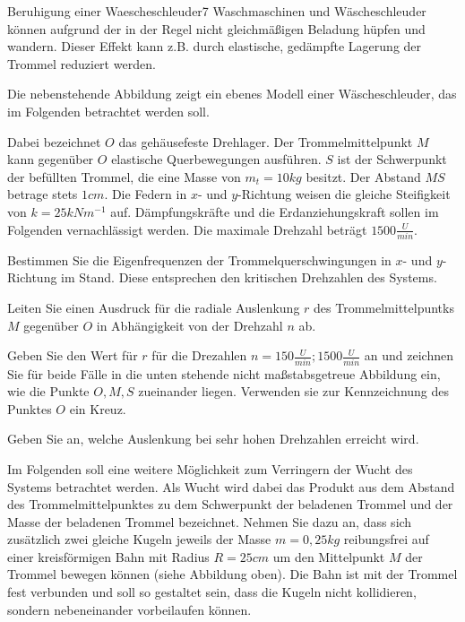 \begin{problem}{Beruhigung einer Waescheschleuder}{7}
Waschmaschinen und Wäscheschleuder können aufgrund der in der Regel nicht gleichmäßigen Beladung hüpfen und wandern. Dieser Effekt kann z.B. durch elastische, gedämpfte Lagerung der Trommel reduziert werden.

Die nebenstehende Abbildung zeigt ein ebenes Modell einer Wäscheschleuder, das im Folgenden betrachtet werden soll.


Dabei bezeichnet $O$ das gehäusefeste Drehlager.  Der Trommelmittelpunkt $M$ kann gegenüber $O$ elastische Querbewegungen ausführen.  $S$ ist der Schwerpunkt der befüllten Trommel, die eine Masse von $m_t=10\unit{kg}$ besitzt.  Der Abstand $MS$ betrage stets $1\unit{cm}$.  Die Federn in $x$- und $y$-Richtung weisen die gleiche Steifigkeit von $k=25\unit{kNm^{-1}}$ auf.  Dämpfungskräfte und die Erdanziehungskraft sollen im Folgenden vernachlässigt werden.  Die maximale Drehzahl beträgt $1500\unit{\frac U{min}}$.

\begin{abcenum}
  \item Bestimmen Sie die Eigenfrequenzen der Trommelquerschwingungen in $x$- und $y$-Richtung im Stand.  Diese entsprechen den kritischen Drehzahlen des Systems.
\item Leiten Sie einen Ausdruck für die radiale Auslenkung $r$ des Trommelmittelpuntks $M$ gegenüber $O$ in Abhängigkeit von der Drehzahl $n$ ab.
\item Geben Sie den Wert für $r$ für die Drezahlen $n=150\unit{\frac{U}{min}}; 1500\unit{\frac{U}{min}}$ an und zeichnen Sie für beide Fälle in die unten stehende nicht maßstabsgetreue Abbildung ein, wie die Punkte $O, M, S$ zueinander liegen.  Verwenden sie zur Kennzeichnung des Punktes $O$ ein Kreuz.
\item Geben Sie an, welche Auslenkung bei sehr hohen Drehzahlen erreicht wird.
\end{abcenum}

Im Folgenden soll eine weitere Möglichkeit zum Verringern der Wucht des Systems betrachtet werden.  Als Wucht wird dabei das Produkt aus dem Abstand des Trommelmittelpunktes zu dem Schwerpunkt der beladenen Trommel und der Masse der beladenen Trommel bezeichnet.  Nehmen Sie dazu an, dass sich zusätzlich zwei gleiche Kugeln jeweils der Masse $m=0,25\unit{kg}$ reibungsfrei auf einer kreisförmigen Bahn mit Radius $R=25\unit{cm}$ um den Mittelpunkt $M$ der Trommel bewegen können (siehe Abbildung oben). Die Bahn ist mit der Trommel fest verbunden und soll so gestaltet sein, dass die Kugeln nicht kollidieren, sondern nebeneinander vorbeilaufen können.


\end{problem}
